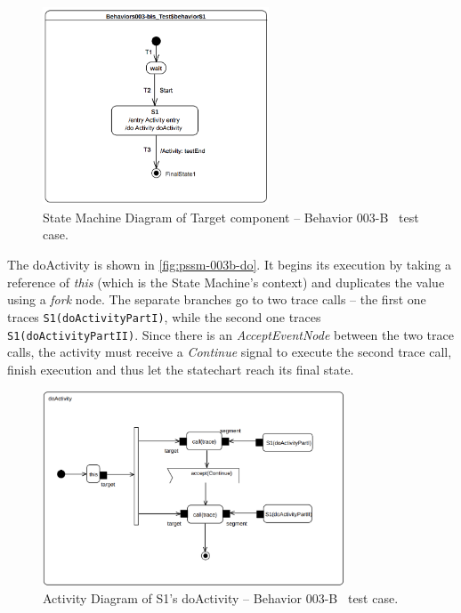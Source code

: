 \begin{figure}
    \centering
    \includegraphics[width=0.6\textwidth]{figures/pssm-003b-sm.png}
    \caption{State Machine Diagram of Target component -- Behavior 003-B~\cite{pssm} test case.}
    \label{fig:pssm-003b-sm}
\end{figure}

The doActivity is shown in \autoref{fig:pssm-003b-do}. It begins its execution by taking a reference of \emph{this} (which is the State Machine's context) and duplicates the value using a \emph{fork} node. The separate branches go to two trace calls -- the first one traces \verb|S1(doActivityPartI)|, while the second one traces \verb|S1(doActivityPartII)|. Since there is an \emph{AcceptEventNode} between the two trace calls, the activity must receive a \emph{Continue} signal to execute the second trace call, finish execution and thus let the statechart reach its final state.

\begin{figure}
    \centering
    \includegraphics[width=0.8\textwidth]{figures/pssm-003b-do.png}
    \caption{Activity Diagram of S1's doActivity -- Behavior 003-B~\cite{pssm} test case.}
    \label{fig:pssm-003b-do}
\end{figure}

